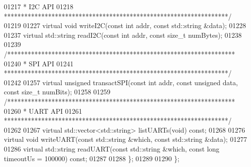 \begin{DoxyCode}
01217 \textcolor{comment}{     * I2C API}
01218 \textcolor{comment}{     ******************************************************************/}
01219 
01227     \textcolor{keyword}{virtual} \textcolor{keywordtype}{void} writeI2C(\textcolor{keyword}{const} \textcolor{keywordtype}{int} addr, \textcolor{keyword}{const} std::string &data);
01228 
01237     \textcolor{keyword}{virtual} std::string readI2C(\textcolor{keyword}{const} \textcolor{keywordtype}{int} addr, \textcolor{keyword}{const} \textcolor{keywordtype}{size\_t} numBytes);
01238 
01239     \textcolor{comment}{/*******************************************************************}
01240 \textcolor{comment}{     * SPI API}
01241 \textcolor{comment}{     ******************************************************************/}
01242 
01257     \textcolor{keyword}{virtual} \textcolor{keywordtype}{unsigned} transactSPI(\textcolor{keyword}{const} \textcolor{keywordtype}{int} addr, \textcolor{keyword}{const} \textcolor{keywordtype}{unsigned} data, \textcolor{keyword}{const} \textcolor{keywordtype}{size\_t} numBits);
01258 
01259     \textcolor{comment}{/*******************************************************************}
01260 \textcolor{comment}{     * UART API}
01261 \textcolor{comment}{     ******************************************************************/}
01262 
01267     \textcolor{keyword}{virtual} std::vector<std::string> listUARTs(\textcolor{keywordtype}{void}) \textcolor{keyword}{const};
01268 
01276     \textcolor{keyword}{virtual} \textcolor{keywordtype}{void} writeUART(\textcolor{keyword}{const} std::string &which, \textcolor{keyword}{const} std::string &data);
01277 
01286     \textcolor{keyword}{virtual} std::string readUART(\textcolor{keyword}{const} std::string &which, \textcolor{keyword}{const} \textcolor{keywordtype}{long} timeoutUs = 100000) \textcolor{keyword}{const};
01287 
01288 \};
01289 
01290 \};
\end{DoxyCode}
